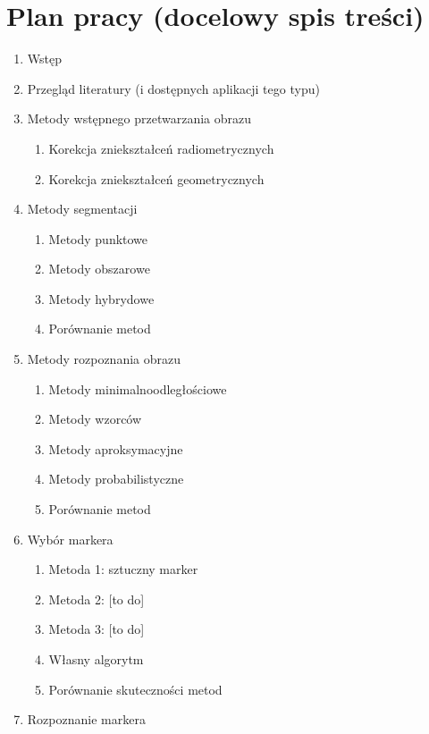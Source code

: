 \chapter{Plan pracy (docelowy spis treści)}

\begin{enumerate}
 \item Wstęp
 \item Przegląd literatury (i dostępnych aplikacji tego typu)
 \item Metody wstępnego przetwarzania obrazu~\cite{graf:przet:obr, anal:przet:obr, geo:tools}
  \begin{enumerate}
   \item Korekcja zniekształceń radiometrycznych
   \item Korekcja zniekształceń geometrycznych
  \end{enumerate}
 \item Metody segmentacji~\cite{graf:przet:obr, anal:przet:obr, roz:obr}
  \begin{enumerate}
   \item Metody punktowe
   \item Metody obszarowe
   \item Metody hybrydowe
   \item Porównanie metod
  \end{enumerate}
 \item Metody rozpoznania obrazu~\cite{graf:przet:obr, anal:przet:obr, roz:obr}
  \begin{enumerate}
   \item Metody minimalnoodległościowe
   \item Metody wzorców
   \item Metody aproksymacyjne
   \item Metody probabilistyczne
   \item Porównanie metod
  \end{enumerate}
 \item Wybór markera~\cite{pic:desc, img:proc, now:przet:obr, mar:det1}
  \begin{enumerate}
   \item Metoda 1: sztuczny marker
   \item Metoda 2: [to do]
   \item Metoda 3: [to do]
   \item Własny algorytm
   \item Porównanie skuteczności metod
  \end{enumerate}
 \item Rozpoznanie markera~\cite{roz:obr, pic:desc, img:proc, mar:det1, mar:det2, mar:det3}

\end{enumerate}
